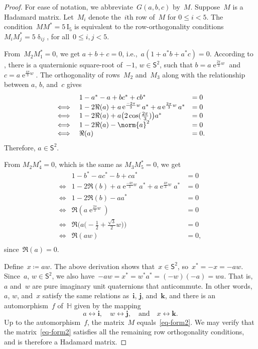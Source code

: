 \documentclass[12pt]{article}
\numberwithin{equation}{section}
\newcommand{\qi}{\mathbf{i}}
\newcommand{\qj}{\mathbf{j}}
\newcommand{\qk}{\mathbf{k}}
\newcommand{\HH}{\mathbb{H}}
\newcommand{\adjoint}{*}
\newcommand{\eqdef}{\coloneqq}
\newcommand{\diracdelta}{\updelta}
\DeclareMathOperator{\e}{e}
\newcommand{\id}{{\mathrm I}}
\newcommand{\qsphere}{{\mathsf S}}
\begin{document}
\begin{proof}
For ease of notation, we abbreviate~$G(a,b,c)$ by~$M$.
Suppose~$M$ is a Hadamard matrix. Let~$M_i$ denote the~$i$th row of~$M$ for $0\leq i<5$. The condition~$M M^\adjoint = 5 \,\id_5$ is equivalent to the row-orthogonality conditions~$M_i M_j^\adjoint = 5 \diracdelta_{ij}$, for all~$0\leq i,j < 5$.

From~$M_2 M_1^\adjoint = 0$, we get $a + b + c = 0$, i.e.,~$a( 1 + a^* b + a^* c) = 0$. According to , there is a quaternionic square-root of~$-1$, $ w \in \qsphere^2$, such that $b = a\e^{\frac {2\pi}{3} w}$ and $c = a\e^{\frac {4\pi}{3} w}$. The orthogonality of rows~$M_2$ and~$M_3$ along with the relationship between $a$, $b$, and~$c$ gives
\[
\begin{array}{cll}
      & 1 - a^*-a+bc^*+cb^* & = 0\\
 \iff & 1 - 2\Re(a)+  a \e^{\frac{-2 \pi}{3} w} a^* + a \e^{\frac{2 \pi}{3} w} a^* & = 0 \\
 \iff & 1 - 2\Re(a)+  a\bigl(2 \cos(\frac {2\pi} 3) \bigr) a^* & = 0 \\
 \iff & 1 - 2\Re(a) - \norm{a}^2 & = 0 \\
 \iff & \Re(a) & = 0 .
\end{array}
\]
Therefore, $a \in \qsphere^2$.

From $M_2 M_4^\adjoint = 0$, which is the same as $M_3 M_5^\adjoint = 0$, we get
\[
\begin{array}{cll}
      & 1 - b^*-ac^*-b+ca^* & = 0\\
 \iff & 1 - 2 \Re(b) + a\e^{\frac{-4\pi}{3} w} a^* + a\e^{\frac{4 \pi}{3} w} a^* & = 0 \\
 \iff & 1 - 2 \Re(b) - aa^* & = 0 \\
 \iff &  \Re( a \e^{\frac{2 \pi}{3} w}) & = 0 \\
 \iff & \Re\bigl( a \bigl( - \frac{1}{2} + \frac{\sqrt{3}}{2} w \bigr) \bigr)  & = 0 \\
 \iff & \Re( aw ) & = 0 ,  \\
\end{array}
\]
since~$\Re(a) = 0$.

Define~$x \eqdef aw$. The above derivation shows that~$x \in \qsphere^2$, so~$x^* = -x = -aw$. Since~$a$, $w \in \qsphere^2$, we also have~$-aw = x^* = w^* a^* = (-w) (-a) = wa$. That is,~$a$ and~$w$ are pure imaginary unit quaternions that anticommute. 
In other words, $a$, $w$, and~$x$ satisfy the same relations as~$\qi$, $\qj$, and~$\qk$, and there is an automorphism~$f$ of~$\HH$ given by the mapping
\[
a \leftrightarrow \qi, \quad w \leftrightarrow \qj, \quad \text{and} \quad x \leftrightarrow \qk .
\]
Up to the automorphism~$f$, the matrix~$M$ equals~\eqref{eq-form2}.
We may verify that the matrix~\eqref{eq-form2} satisfies all the remaining row orthogonality conditions, and is therefore a Hadamard matrix.
\end{proof}
\end{document}
